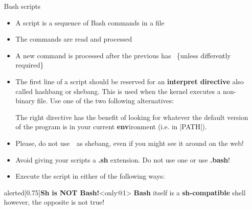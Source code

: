 \begin{frame}[fragile]{Bash scripts}
    \vspace{-6mm}
    \begin{itemize}
        \item A script is a sequence of Bash commands in a file
        \item The commands are read and processed 
        \item A new command is processed after the previous has  {\tiny~\{unless differently required\}}
        \item The first line of a script should be reserved for an \textbf{interpret directive} also called \alert{hashbang} or \alert{shebang}.
              This is used when the kernel executes a non-binary file.
              Use one of the two following alternatives: \\
              \begin{center}
                  \par{\ssmall The right directive has the benefit of looking for whatever the default version of the program is in your current \textbf{env}ironment (i.e. in \bash|PATH|).}
              \end{center}
        \item<only@1> Please, \alert{do not use} \,\, as shebang, even if you might see it around on the web!
        \item<only@1> Avoid giving your scripts a \textbf{.sh} extension. Do not use one or use \alert{\textbf{.bash}}!
        \item<only@2> Execute the script in either of the following ways:
    \end{itemize}
    \begin{varblock}{alerted}[0.75\textwidth]{\textbf{Sh is NOT Bash!}}<only@1>
        \textbf{Bash} itself is a \textbf{sh-compatible} shell however, the opposite is not true!

\end{varblock}
\end{frame}
